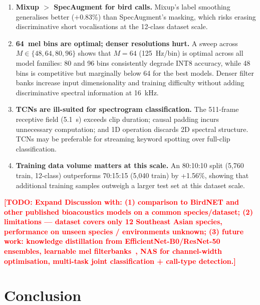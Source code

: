 \documentclass[final,5p,times,twocolumn,nolinenum]{elsarticle}
\newcommand{\TODO}[1]{\textcolor{red}{\textbf{[TODO: #1]}}}
\begin{document}
\begin{enumerate}
  \item \textbf{Mixup $>$ SpecAugment for bird calls.}
        Mixup's label smoothing generalises better ($+$0.83\%) than
        SpecAugment's masking, which risks erasing discriminative short
        vocalisations at the 12-class dataset scale.

  \item \textbf{64~mel bins are optimal; denser resolutions hurt.}
        A sweep across $M \in \{48, 64, 80, 96\}$ shows that $M=64$
        (125~Hz/bin) is optimal across all model families: 80 and 96 bins
        consistently degrade INT8 accuracy, while 48 bins is competitive
        but marginally below 64 for the best models.  Denser filter banks
        increase input dimensionality and training difficulty without
        adding discriminative spectral information at \SI{16}{kHz}.

  \item \textbf{TCNs are ill-suited for spectrogram classification.}
        The 511-frame receptive field (5.1~s) exceeds clip duration;
        causal padding incurs unnecessary computation; and 1D operation
        discards 2D spectral structure. TCNs may be preferable for
        streaming keyword spotting over full-clip classification.

  \item \textbf{Training data volume matters at this scale.}
        An 80:10:10 split (5{,}760 train, 12-class) outperforms 70:15:15
        (5{,}040 train) by +1.56\%, showing that additional training
        samples outweigh a larger test set at this dataset scale.
\end{enumerate}

\TODO{Expand Discussion with: (1) comparison to BirdNET and other published
bioacoustics models on a common species/dataset; (2) limitations ---
dataset covers only 12 Southeast Asian species, performance on unseen
species / environments unknown; (3) future work: knowledge distillation from
EfficientNet-B0/ResNet-50 ensembles, learnable mel
filterbanks~\cite{zeghidour2018learning}, NAS for channel-width
optimisation, multi-task joint classification + call-type detection.}

\section{Conclusion}
\label{sec:conclusion}
\end{document}
